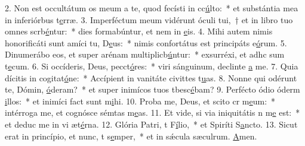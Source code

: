 2. Non est occultátum os meum a te, quod fecísti in cc\uline{ú}lto:~* et substántia mea in inferiórbus t\uline{e}rræ.
3. Imperféctum meum vidérunt óculi tui,~† et in libro tuo omnes scrb\uline{é}ntur:~* dies formabúntur, et nem in \uline{e}is.
4. Mihi autem nimis honorificáti sunt amíci tu, D\uline{e}us:~* nimis confortátus est principáts e\uline{ó}rum.
5. Dinumerábo eos, et super arénam multiplicb\uline{ú}ntur:~* exsurréxi, et adhc sum t\uline{e}cum.
6. Si occíderis, Deus, pecct\uline{ó}res:~* viri sánguinum, declinte \uline{a} me.
7. Quia dícitis in cogitat\uline{ó}ne:~* Accípient in vanitáte civittes t\uline{u}as.
8. Nonne qui odérunt te, Dómin, \uline{ó}deram?~* et super inimícos tuos tbesc\uline{é}bam?
9. Perfécto ódio óderm \uline{i}llos:~* et inimíci fact sunt m\uline{i}hi.
10. Proba me, Deus, et scito cr m\uline{e}um:~* intérroga me, et cognósce sémtas m\uline{e}as.
11. Et vide, si via iniquitátis n m\uline{e} est:~* et deduc me in vi æt\uline{é}rna.
12. Glória Patri, t F\uline{í}lio,~* et Spiríti S\uline{a}ncto.
13. Sicut erat in princípio, et nunc, t s\uline{e}mper,~* et in sǽcula sæculrum. \uline{A}men.
